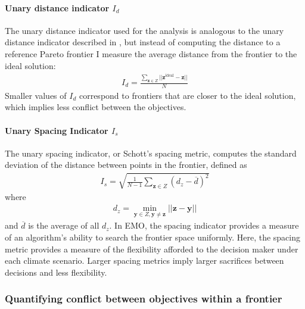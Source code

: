 \paragraph{Unary distance indicator $I_d$} The unary distance indicator used for the analysis is analogous to the unary distance indicator described in \cite{czyzzak1998pareto}, but instead of computing the distance to a reference Pareto frontier I measure the average distance from the frontier to the ideal solution:
\begin{align}
I_d = \frac{\sum_{\mathbf{z} \in Z} ||\mathbf{z}^{\text{ideal}} - \mathbf{z} ||}{N}
\end{align}
Smaller values of $I_d$ correspond to frontiers that are closer to the ideal solution, which implies less conflict between the objectives.

\paragraph{Unary Spacing Indicator $I_s$} The unary spacing indicator, or Schott's spacing metric\cite{schott1995fault}, computes the standard deviation of the distance between points in the frontier, defined as
\begin{align}
I_s = \sqrt{\frac{1}{N-1} \sum_{\mathbf{z} \in Z} (d_z - \overbar{d})^2}
\end{align}
where
\begin{align}
d_z = \min_{\mathbf{y} \in Z, \mathbf{y} \neq \mathbf{z}} ||\mathbf{z} - \mathbf{y}||
\end{align}
and $\overbar{d}$ is the average of all $d_z$. In EMO, the spacing indicator provides a measure of an algorithm's ability to search the frontier space uniformly. Here, the spacing metric provides a measure of the flexibility afforded to the decision maker under each climate scenario. Larger spacing metrics imply larger sacrifices between decisions and less flexibility.

\subsubsection{Quantifying conflict between objectives within a frontier}

